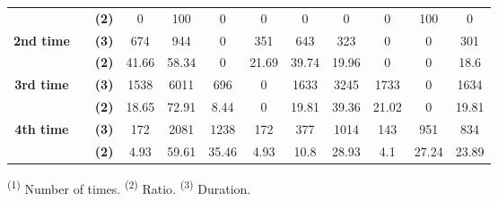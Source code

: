 \begin{table}
{\begin{tabular}{|c|c|c|c|c|c|c|c|c|c|c|c|}
         &  & \textbf{(2)} & 0 & 100 & 0 & 0 & 0 & 0 & 0 & 100 & 0\\ \cline{3-12} \cline{1-1}
         \multirow{2}{*}{\textbf{2nd time}}&  & \textbf{(3)} & 674 & 944 & 0 & 351 & 643 & 323 & 0 & 0 & 301\\ \cline{3-12}
         &  & \textbf{(2)} & 41.66 & 58.34 & 0 & 21.69 & 39.74 & 19.96 & 0 & 0 &18.6\\ \cline{3-12} \cline{1-1}
         \multirow{2}{*}{\textbf{3rd time}}&  & \textbf{(3)} & 1538 & 6011 & 696 & 0 & 1633 & 3245 & 1733 & 0 &1634\\ \cline{3-12}
         &  & \textbf{(2)} & 18.65 & 72.91 & 8.44 & 0 & 19.81 & 39.36 & 21.02 & 0 & 19.81\\ \cline{3-12} \cline{1-1}
         \multirow{2}{*}{\textbf{4th time}}&  & \textbf{(3)} & 172 & 2081 & 1238 & 172 & 377 & 1014 & 143 & 951 & 834\\ \cline{3-12}
         &  & \textbf{(2)} & 4.93 & 59.61 & 35.46 & 4.93 & 10.8 & 28.93 & 4.1 & 27.24 & 23.89\\ \hline
    \end{tabular}}
    \label{tb7}
    \vspace{2mm}
    \parbox{\linewidth}{
    \footnotesize
    \textsuperscript{(1)} Number of times. \hspace{2mm}
    \textsuperscript{(2)} Ratio. \hspace{2mm}
    \textsuperscript{(3)} Duration. }
\end{table}


